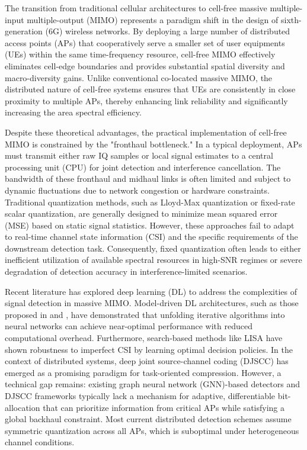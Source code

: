 The transition from traditional cellular architectures to cell-free massive multiple-input multiple-output (MIMO) represents a paradigm shift in the design of sixth-generation (6G) wireless networks. By deploying a large number of distributed access points (APs) that cooperatively serve a smaller set of user equipments (UEs) within the same time-frequency resource, cell-free MIMO effectively eliminates cell-edge boundaries and provides substantial spatial diversity and macro-diversity gains. Unlike conventional co-located massive MIMO, the distributed nature of cell-free systems ensures that UEs are consistently in close proximity to multiple APs, thereby enhancing link reliability and significantly increasing the area spectral efficiency.

Despite these theoretical advantages, the practical implementation of cell-free MIMO is constrained by the "fronthaul bottleneck." In a typical deployment, APs must transmit either raw IQ samples or local signal estimates to a central processing unit (CPU) for joint detection and interference cancellation. The bandwidth of these fronthaul and midhaul links is often limited and subject to dynamic fluctuations due to network congestion or hardware constraints. Traditional quantization methods, such as Lloyd-Max quantization or fixed-rate scalar quantization, are generally designed to minimize mean squared error (MSE) based on static signal statistics. However, these approaches fail to adapt to real-time channel state information (CSI) and the specific requirements of the downstream detection task. Consequently, fixed quantization often leads to either inefficient utilization of available spectral resources in high-SNR regimes or severe degradation of detection accuracy in interference-limited scenarios.

Recent literature has explored deep learning (DL) to address the complexities of signal detection in massive MIMO. Model-driven DL architectures, such as those proposed in \cite{he2020model} and \cite{wei2020learned}, have demonstrated that unfolding iterative algorithms into neural networks can achieve near-optimal performance with reduced computational overhead. Furthermore, search-based methods like LISA \cite{sun2020learning} have shown robustness to imperfect CSI by learning optimal decision policies. In the context of distributed systems, deep joint source-channel coding (DJSCC) has emerged as a promising paradigm for task-oriented compression. However, a technical gap remains: existing graph neural network (GNN)-based detectors and DJSCC frameworks typically lack a mechanism for adaptive, differentiable bit-allocation that can prioritize information from critical APs while satisfying a global backhaul constraint. Most current distributed detection schemes assume symmetric quantization across all APs, which is suboptimal under heterogeneous channel conditions.

